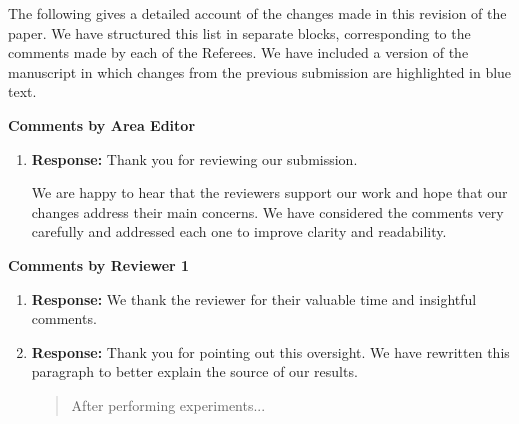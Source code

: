 \documentclass[10pt]{article}
\renewcommand{\theenumi}{(\roman{enumi})}
\renewcommand{\labelenumi}{\theenumi}
\begin{document}
\bigskip

The following gives a detailed account of the changes made in this revision of the paper. We have structured this list in separate blocks, corresponding to the comments made by each of the Referees.  We have included a version of the manuscript in which changes from the previous submission are highlighted in blue text. 






 \hspace*{-25pt} \textbf{\large Comments by Area Editor}
 \begin{enumerate}
   \renewcommand{\labelenumi}{[AE:\,\arabic{enumi}]}

 \item {} 

\textbf{Response:}  Thank you for reviewing our submission.

We are happy to hear that the reviewers support our work and hope that our changes address their main concerns. We have considered the comments very carefully and addressed each one to improve clarity and readability. 

\end{enumerate}


\bigskip
\hspace*{-25pt} \textbf{\large Comments by Reviewer 1}\\



\begin{enumerate}
  \renewcommand{\labelenumi}{[R1:\,\arabic{enumi}]}


 \item {}

 \textbf{Response: } We thank the reviewer for their valuable time and insightful comments.


 \item {}
 \textbf{Response: } Thank you for pointing out this oversight.  We have rewritten this paragraph to better explain the source of our results.
 
 \begin{quote}
    After performing experiments...   
 \end{quote}

\end{enumerate}
\end{document}
